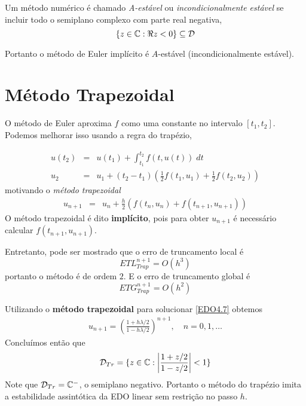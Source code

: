 \begin{defn}
Um método numérico é chamado \emph{A-estável} ou \emph{incondicionalmente estável} se incluir todo o semiplano complexo com parte real negativa,
$$    \{z \in \mathbb{C}: \Re{z}<0\} \subseteq \mathcal D$$
\end{defn}


Portanto o método de Euler implícito é $A$-estável (incondicionalmente estável).






















\section{Método Trapezoidal}
O método de Euler aproxima $f$ como uma constante no intervalo $[t_1,t_2]$. Podemos melhorar isso usando a regra do trapézio,

\begin{eqnarray}
  u(t_2) &=& u(t_1) +  \int _{t_1}^{t_2}  f(t,u(t)) \; dt \\
  u_2    &=&   u_1  +  (t_2-t_1)\left(\frac{1}{2}f(t_1,u_1)+\frac{1}{2}f(t_2,u_2)\right)
\end{eqnarray}
motivando o \emph{método trapezoidal}
\begin{eqnarray}
  u_{n+1} &=& u_n +  \frac{h}{2} \left(f(t_n,u_n)+f(t_{n+1},u_{n+1})\right)
\end{eqnarray}
O método trapezoidal é dito \textbf{implícito}, pois para obter $u_{n+1}$ é necessário calcular $f(t_{n+1},u_{n+1})$.

Entretanto, pode ser mostrado que o erro de truncamento local é
$$ETL_{Trap}^{n+1}= O(h^3)$$
portanto o método é de ordem $2$. E o erro de truncamento global é
$$ETG_{Trap}^{n+1}= O(h^2)$$


\begin{ex}
Utilizando o \textbf{método trapezoidal} para solucionar \eqref{EDO4.7} obtemos
\begin{eqnarray}
 u_{n+1} = \left(\frac{1+ h\lambda /2}{1- h\lambda /2}\right)^{n+1}, \quad  n=0,1,\ldots
\end{eqnarray}
Concluímos então que
\begin{eqnarray}
 \mathcal D_{Tr} = \{z \in  \mathbb{C}:  \left|\frac{1+ z/2}{1- z/2}\right|<1\}
\end{eqnarray}
Note que $\mathcal D_{Tr}=\mathbb{C}^-$, o semiplano negativo. Portanto o método do trapézio imita a estabilidade assintótica da EDO linear sem restrição no passo $h$.
\end{ex}




